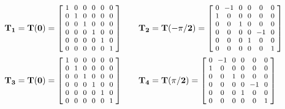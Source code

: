 %
%
\begin{align*}
\mathbf{T_1}=\mathbf{T(0)} &=
{\arraycolsep=3pt\medmuskip=0.8mu\footnotesize
\left[
\begin{array}{cccccc}
 1 & 0 & 0 & 0 & 0 & 0 \\
 0 & 1 & 0 & 0 & 0 & 0 \\
 0 & 0 & 1 & 0 & 0 & 0 \\
 0 & 0 & 0 & 1 & 0 & 0 \\
 0 & 0 & 0 & 0 & 1 & 0 \\
 0 & 0 & 0 & 0 & 0 & 1 \\
\end{array}
 \right]
 }
\qquad
\mathbf{T_2}=\mathbf{T(-\pi/2)} =
{\arraycolsep=3pt\medmuskip=0.8mu\footnotesize
\left[
\begin{array}{cccccc}
 0 & -1 & 0 & 0 & 0 & 0 \\
 1 & 0 & 0 & 0 & 0 & 0 \\
 0 & 0 & 1 & 0 & 0 & 0 \\
 0 & 0 & 0 & 0 & -1 & 0 \\
 0 & 0 & 0 & 1 & 0 & 0 \\
 0 & 0 & 0 & 0 & 0 & 1 \\
\end{array}
 \right]
 }
 \\
 \mathbf{T_3}=\mathbf{T(0)} &=
{\arraycolsep=3pt\medmuskip=0.8mu\footnotesize
\left[
\begin{array}{cccccc}
 1 & 0 & 0 & 0 & 0 & 0 \\
 0 & 1 & 0 & 0 & 0 & 0 \\
 0 & 0 & 1 & 0 & 0 & 0 \\
 0 & 0 & 0 & 1 & 0 & 0 \\
 0 & 0 & 0 & 0 & 1 & 0 \\
 0 & 0 & 0 & 0 & 0 & 1 \\
\end{array}
 \right]
 } 
 \qquad
 \mathbf{T_4}=\mathbf{T(\pi/2)} =
{\arraycolsep=3pt\medmuskip=0.8mu\footnotesize
\left[
\begin{array}{cccccc}
 0 & -1 & 0 & 0 & 0 & 0 \\
 1 & 0 & 0 & 0 & 0 & 0 \\
 0 & 0 & 1 & 0 & 0 & 0 \\
 0 & 0 & 0 & 0 & -1 & 0 \\
 0 & 0 & 0 & 1 & 0 & 0 \\
 0 & 0 & 0 & 0 & 0 & 1 \\
\end{array}
 \right]
 }
\\

\end{align*}
